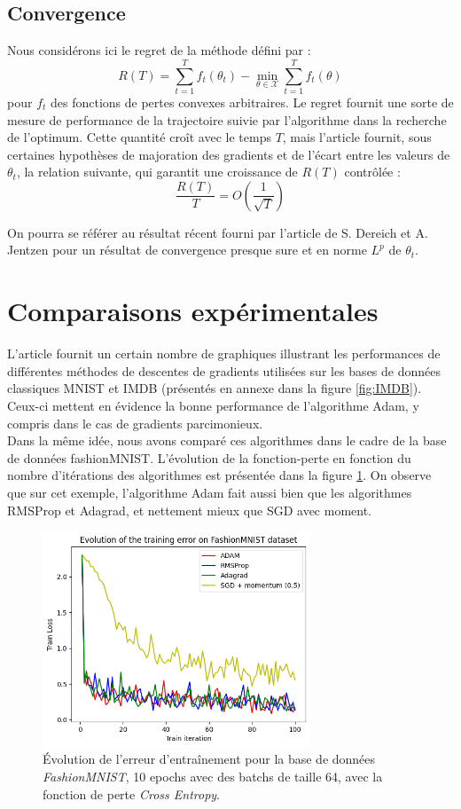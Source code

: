 \documentclass[11pt,a4paper, french]{article}
\newcommand{\dsum}[2]{\displaystyle\sum_{#1}^{#2}}
\theoremstyle{definition}
\begin{document}
\subsection{Convergence}

Nous considérons ici le regret de la méthode défini par : 
$$R(T)=\dsum{t=1}Tf_t(\theta_t)-\min_{\theta\in\mathcal X}\dsum{t=1}Tf_t(\theta)$$
pour $f_t$ des fonctions de pertes convexes arbitraires. Le regret fournit une sorte de mesure de performance de la trajectoire suivie par l'algorithme dans la recherche de l'optimum. Cette quantité croît avec le temps $T$, mais l'article fournit, sous certaines hypothèses de majoration des gradients et de l'écart entre les valeurs de $\theta_t$,  la relation suivante, qui garantit une croissance de $R(T)$ contrôlée :
$$\dfrac{R(T)}{T}=O\left(\dfrac 1{\sqrt T}\right)$$

On pourra se référer au résultat récent fourni par l'article de S. Dereich et A. Jentzen \cite{dereich2024convergenceratesadamoptimizer} pour un résultat de convergence presque sure et en norme $L^p$ de $\theta_t$. 

\section{Comparaisons expérimentales}
L'article fournit un certain nombre de graphiques illustrant les performances de différentes méthodes de descentes de gradients utilisées sur les bases de données classiques MNIST et IMDB (présentés en annexe dans la figure \ref{fig:IMDB}). Ceux-ci mettent en évidence la bonne performance de l'algorithme Adam, y compris dans le cas de gradients parcimonieux. \\
Dans la même idée, nous avons comparé ces algorithmes dans le cadre de la base de données fashionMNIST. L'évolution de la fonction-perte en fonction du nombre d'itérations des algorithmes est présentée dans la figure \ref{fig1}. On observe que sur cet exemple, l'algorithme Adam fait aussi bien que les algorithmes RMSProp et Adagrad, et nettement mieux que SGD avec moment. 



\begin{figure}[H]
\centering
 \includegraphics[width=8cm]{FashionMNIST.png}
\caption{Évolution de l'erreur d'entraînement pour la base de données \textit{FashionMNIST}, 10 epochs avec des batchs de taille 64, avec la fonction de perte \textit{Cross Entropy}.}
\label{fig1}
\end{figure}
\end{document}
